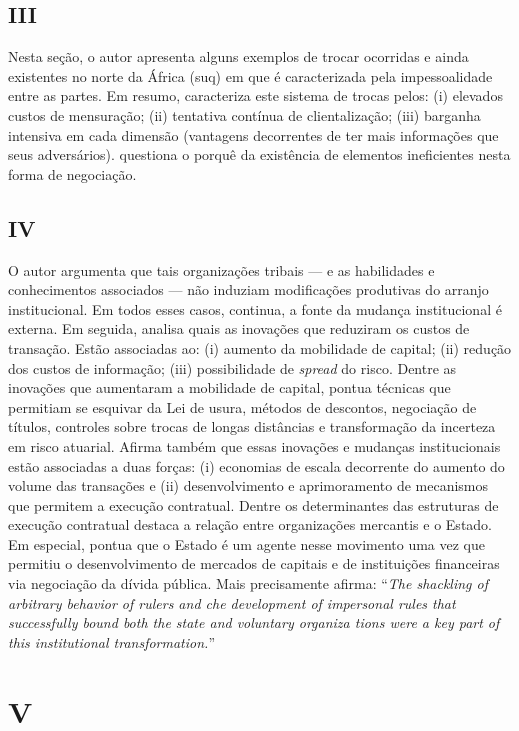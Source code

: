 \subsection*{III}

Nesta seção, o autor apresenta alguns exemplos de trocar ocorridas e ainda existentes no norte da África (suq) em que é caracterizada pela impessoalidade entre as partes. Em resumo, caracteriza este sistema de trocas pelos: (i) elevados custos de mensuração; (ii) tentativa contínua de clientalização; (iii) barganha intensiva em cada dimensão (vantagens decorrentes de ter mais informações que seus adversários). \autor questiona o porquê da existência de elementos ineficientes nesta forma de negociação.


\subsection*{IV}

O autor argumenta que tais organizações tribais --- e as habilidades e conhecimentos associados --- não induziam modificações produtivas do arranjo institucional. Em todos esses casos, continua, a fonte da mudança institucional é externa. Em seguida, analisa quais as inovações que reduziram os custos de transação. Estão associadas ao: (i) aumento da mobilidade de capital; (ii) redução dos custos de informação; (iii) possibilidade de \textit{spread} do risco. Dentre as inovações que aumentaram a mobilidade de capital, pontua técnicas que permitiam se esquivar da Lei de usura, métodos de descontos, negociação de títulos, controles sobre trocas de longas distâncias e transformação da incerteza em risco atuarial. Afirma também que essas inovações e mudanças institucionais estão associadas a duas forças: (i) economias de escala decorrente do aumento do volume das transações e (ii) desenvolvimento e aprimoramento de mecanismos que permitem a execução contratual. Dentre os determinantes das estruturas de execução contratual destaca a relação entre organizações mercantis e o Estado. Em especial, pontua que o Estado é um agente nesse movimento uma vez que permitiu o desenvolvimento de mercados de capitais e de instituições financeiras via negociação da dívida pública. Mais precisamente afirma: ``\textit{The
	shackling of arbitrary behavior of rulers and che development of imper­sonal rules that successfully bound both the state and voluntary organiza­
	tions were a key part of this institutional transformation.}''


\section{V}

